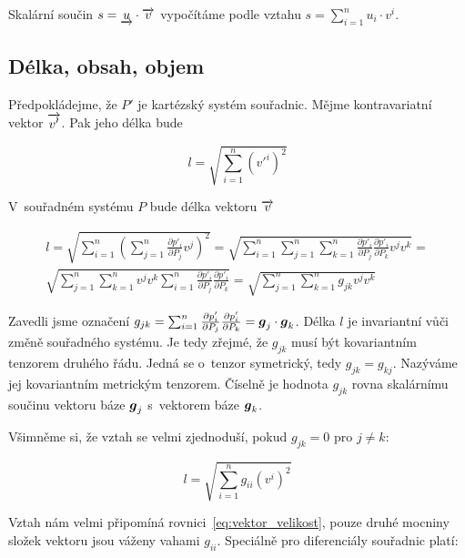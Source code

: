 \begin{fact}
Skalární součin \(s = \underrightarrow{u} \cdot \overrightarrow{v}\) vypočítáme podle vztahu \(s = \sum_{i=1}^n u_i \cdot v^i\).
\end{fact}

\subsection{Délka, obsah, objem}

Předpokládejme, že \(P'\) je kartézský systém souřadnic. Mějme kontravariatní vektor \(\overrightarrow{v'}\). Pak jeho délka bude

\begin{equation}
l = \sqrt{\sum_{i=1}^n (v'^i)^2}
\end{equation}

V~souřadném systému \(P\) bude délka vektoru \(\overrightarrow{v}\)

\begin{equation}
\begin{split}
l = \sqrt{\sum_{i=1}^n \left(\sum_{j=1}^n \frac{\partial p'_i}{\partial P_j} v^j \right)^2} = \sqrt{\sum_{i=1}^n \sum_{j=1}^n \sum_{k=1}^n \frac{\partial p'_i}{\partial P_j} \frac{\partial p'_i}{\partial P_k} v^j v^k} = \\
\sqrt{\sum_{j=1}^n \sum_{k=1}^n v^j v^k \sum_{i=1}^n \frac{\partial p'_i}{\partial P_j} \frac{\partial p'_i}{\partial P_k}} = \sqrt{\sum_{j=1}^n \sum_{k=1}^n g_{jk} v^j v^k}
\end{split}
\end{equation}

Zavedli jsme označení \(g_{jk} = \sum_{i=1}^n \frac{\partial p'_i}{\partial P_j} \frac{\partial p'_i}{\partial P_k} = \boldsymbol{g}_j \cdot \boldsymbol{g}_k\). Délka \(l\) je invariantní vůči změně souřadného systému. Je tedy zřejmé, že \(g_{jk}\) musí být kovariantním tenzorem druhého řádu. Jedná se o~tenzor symetrický, tedy \(g_{jk} = g_{kj}\). Nazýváme jej kovariantním metrickým tenzorem. Číselně je hodnota \(g_{jk}\) rovna skalárnímu součinu vektoru báze \(\boldsymbol{g}_j\) s~vektorem báze \(\boldsymbol{g}_k\).

Všimněme si, že vztah se velmi zjednoduší, pokud \(g_{jk} = 0\) pro \(j \neq k\):

\begin{equation}
l = \sqrt{\sum_{i=1}^n g_{ii} (v^i)^2}
\end{equation}

Vztah nám velmi připomíná rovnici~\eqref{eq:vektor_velikost}, pouze druhé mocniny složek vektoru jsou váženy vahami \(g_{ii}\). Speciálně pro diferenciály souřadnic platí:

